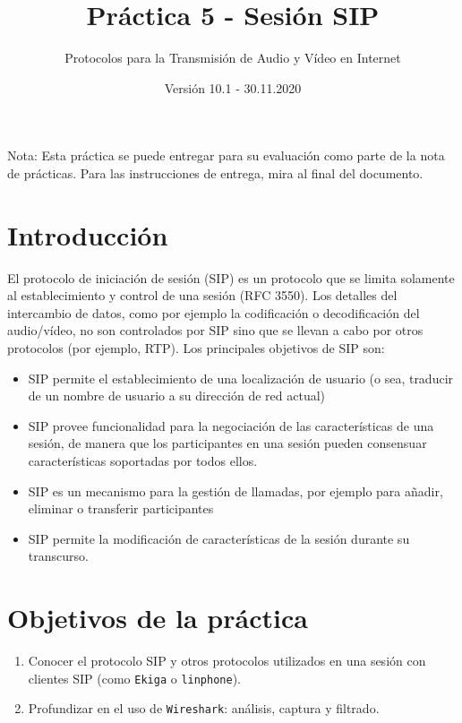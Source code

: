 \documentclass[11pt,a4paper]{article}
\begin{document}
\title{Práctica 5 - Sesión SIP}
\author{Protocolos para la Transmisión de Audio y Vídeo en Internet}
\date{Versión 10.1 - 30.11.2020}


\maketitle

Nota: Esta práctica se puede entregar para su evaluación como parte de la nota de prácticas. Para las instrucciones de entrega, mira al final del documento. 

\section{Introducción}

El protocolo de iniciación de sesión (SIP) es un protocolo que se limita solamente al establecimiento y control de una sesión (RFC 3550). Los detalles del intercambio de datos, como por ejemplo la codificación o decodificación del audio/vídeo, no son controlados por SIP sino que se llevan a cabo por otros protocolos (por ejemplo, RTP). Los principales objetivos de SIP son:

\begin{itemize}
  \item SIP permite el establecimiento de una localización de usuario (o sea, traducir de un nombre de usuario a su dirección de red actual)
  \item SIP provee funcionalidad para la negociación de las características de una sesión, de manera que los participantes en una sesión pueden consensuar características soportadas por todos ellos.
  \item SIP es un mecanismo para la gestión de llamadas, por ejemplo para añadir, eliminar o transferir participantes
  \item SIP permite la modificación de características de la sesión durante su transcurso.
\end{itemize}

\section{Objetivos de la práctica}

\begin{enumerate}
  \item Conocer el protocolo SIP y otros protocolos utilizados en una sesión con clientes SIP (como \texttt{Ekiga} o \texttt{linphone}).
  \item Profundizar en el uso de \texttt{Wireshark}: análisis, captura y filtrado.
\end{enumerate}
\end{document}
